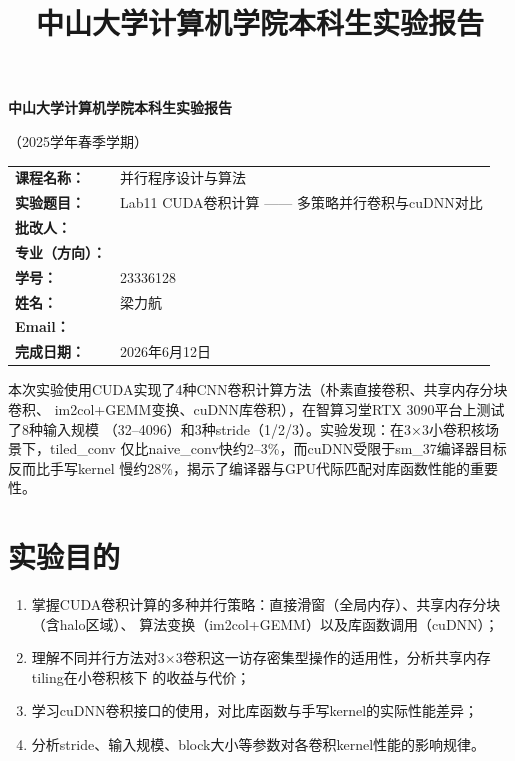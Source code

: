 \documentclass[UTF8,a4paper,12pt,fontset=none]{ctexart}
\title{\bfseries 中山大学计算机学院本科生实验报告}
\author{}
\date{}
\begin{document}
\begin{titlepage}
  \centering
  {\bfseries 中山大学计算机学院本科生实验报告\par}
  \vspace{0.5em}
  {（2025学年春季学期）\par}
  \vspace{2em}

  \begin{tabularx}{0.9\textwidth}{>{\bfseries}p{4cm}X}
    课程名称： & 并行程序设计与算法 \\
    实验题目： & Lab11 CUDA卷积计算 —— 多策略并行卷积与cuDNN对比 \\
    批改人： & \\
    专业（方向）： & \\
    学号： & 23336128 \\
    姓名： & 梁力航 \\
    Email： & \\
    完成日期： & 2026年6月12日 \\
  \end{tabularx}

  \vfill
  \begin{minipage}{0.88\textwidth}
    \small
    本次实验使用CUDA实现了4种CNN卷积计算方法（朴素直接卷积、共享内存分块卷积、
    im2col+GEMM变换、cuDNN库卷积），在智算习堂RTX 3090平台上测试了8种输入规模
    （32--4096）和3种stride（1/2/3）。实验发现：在3×3小卷积核场景下，tiled\_conv
    仅比naive\_conv快约2--3\%，而cuDNN受限于sm\_37编译器目标反而比手写kernel
    慢约28\%，揭示了编译器与GPU代际匹配对库函数性能的重要性。
  \end{minipage}
\end{titlepage}

\section{实验目的}

\begin{enumerate}[leftmargin=2.2em]
  \item 掌握CUDA卷积计算的多种并行策略：直接滑窗（全局内存）、共享内存分块（含halo区域）、
        算法变换（im2col+GEMM）以及库函数调用（cuDNN）；
  \item 理解不同并行方法对3×3卷积这一访存密集型操作的适用性，分析共享内存tiling在小卷积核下
        的收益与代价；
  \item 学习cuDNN卷积接口的使用，对比库函数与手写kernel的实际性能差异；
  \item 分析stride、输入规模、block大小等参数对各卷积kernel性能的影响规律。
\end{enumerate}
\end{document}
